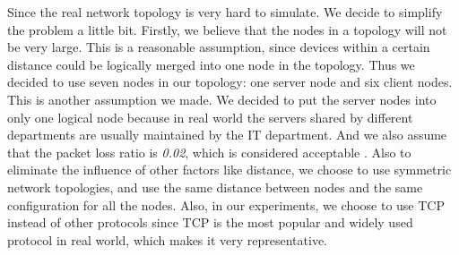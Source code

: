 Since the real network topology is very hard to simulate. 
We decide to simplify the problem a little bit. 
Firstly, we believe that the nodes in a topology will not be very large. 
This is a reasonable assumption, since devices within a certain distance 
could be logically merged into one node in the topology. 
Thus we decided to use seven nodes in our topology: 
one server node and six client nodes. This is another assumption we made. 
We decided to put the server nodes into only one logical node 
because in real world the servers shared by different departments are usually 
maintained by the IT department. And we also assume that 
the packet loss ratio is \textit{0.02}, which is considered acceptable \cite{PacketLoss:wiki}. 
Also to eliminate the influence of other factors like distance, 
we choose to use symmetric network topologies, 
and use the same distance between nodes and the same configuration for all the nodes.
Also, in our experiments, we choose to use TCP instead of other protocols since TCP is the most 
popular and widely used protocol in real world, which makes it very representative.
